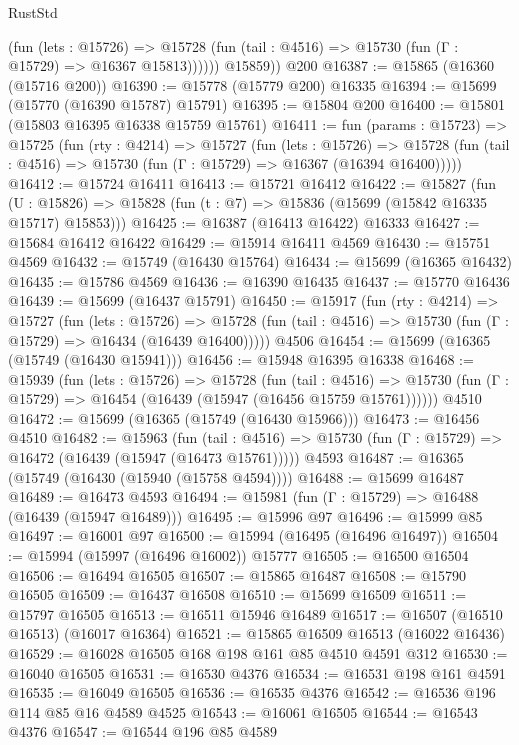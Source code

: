 \begin{lexlean}{RustStd}
\begin{coremodule}
              (fun (lets : @15726) =>
              @15728 (fun (tail : @4516) => @15730 (fun (Γ : @15729) => @16367 @15813))))))
        @15859))
    @200
@16387 := @15865 (@16360 (@15716 @200))
@16390 := @15778 (@15779 @200) @16335
@16394 := @15699 (@15770 (@16390 @15787) @15791)
@16395 := @15804 @200
@16400 := @15801 (@15803 @16395 @16338 @15759 @15761)
@16411 := fun (params : @15723) =>
  @15725
    (fun (rty : @4214) =>
    @15727
      (fun (lets : @15726) =>
      @15728 (fun (tail : @4516) => @15730 (fun (Γ : @15729) => @16367 (@16394 @16400)))))
@16412 := @15724 @16411
@16413 := @15721 @16412
@16422 := @15827
    (fun (U : @15826) => @15828 (fun (t : @7) => @15836 (@15699 (@15842 @16335 @15717) @15853)))
@16425 := @16387 (@16413 @16422) @16333
@16427 := @15684 @16412 @16422
@16429 := @15914 @16411 @4569
@16430 := @15751 @4569
@16432 := @15749 (@16430 @15764)
@16434 := @15699 (@16365 @16432)
@16435 := @15786 @4569
@16436 := @16390 @16435
@16437 := @15770 @16436
@16439 := @15699 (@16437 @15791)
@16450 := @15917
    (fun (rty : @4214) =>
    @15727
      (fun (lets : @15726) =>
      @15728 (fun (tail : @4516) => @15730 (fun (Γ : @15729) => @16434 (@16439 @16400)))))
    @4506
@16454 := @15699 (@16365 (@15749 (@16430 @15941)))
@16456 := @15948 @16395 @16338
@16468 := @15939
    (fun (lets : @15726) =>
    @15728
      (fun (tail : @4516) =>
      @15730 (fun (Γ : @15729) => @16454 (@16439 (@15947 (@16456 @15759 @15761))))))
    @4510
@16472 := @15699 (@16365 (@15749 (@16430 @15966)))
@16473 := @16456 @4510
@16482 := @15963
    (fun (tail : @4516) => @15730 (fun (Γ : @15729) => @16472 (@16439 (@15947 (@16473 @15761)))))
    @4593
@16487 := @16365 (@15749 (@16430 (@15940 (@15758 @4594))))
@16488 := @15699 @16487
@16489 := @16473 @4593
@16494 := @15981 (fun (Γ : @15729) => @16488 (@16439 (@15947 @16489)))
@16495 := @15996 @97
@16496 := @15999 @85
@16497 := @16001 @97
@16500 := @15994 (@16495 (@16496 @16497))
@16504 := @15994 (@15997 (@16496 @16002)) @15777
@16505 := @16500 @16504
@16506 := @16494 @16505
@16507 := @15865 @16487
@16508 := @15790 @16505
@16509 := @16437 @16508
@16510 := @15699 @16509
@16511 := @15797 @16505
@16513 := @16511 @15946 @16489
@16517 := @16507 (@16510 @16513) (@16017 @16364)
@16521 := @15865 @16509 @16513 (@16022 @16436)
@16529 := @16028 @16505 @168 @198 @161 @85 @4510 @4591 @312
@16530 := @16040 @16505
@16531 := @16530 @4376
@16534 := @16531 @198 @161 @4591
@16535 := @16049 @16505
@16536 := @16535 @4376
@16542 := @16536 @196 @114 @85 @16 @4589 @4525
@16543 := @16061 @16505
@16544 := @16543 @4376
@16547 := @16544 @196 @85 @4589

\end{coremodule}
\end{lexlean}
